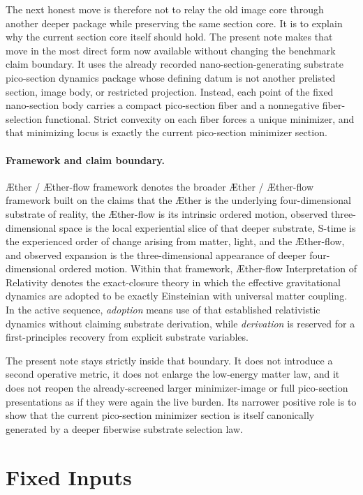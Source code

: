 \documentclass[11pt]{article}
\newcommand{\Aether}{\AE{}ther}
\newcommand{\Aflow}{\AE{}ther-flow}
\newcommand{\TheoryName}{\Aflow{} Interpretation of Relativity}
\newcommand{\TheoryProgram}{\Aether{} / \Aflow{} framework}
\begin{document}
The next honest move is therefore not to relay the old image core through another deeper package while preserving the same section core. It is to explain why the current section core itself should hold. The present note makes that move in the most direct form now available without changing the benchmark claim boundary. It uses the already recorded nano-section-generating substrate pico-section dynamics package whose defining datum is not another prelisted section, image body, or restricted projection. Instead, each point of the fixed nano-section body carries a compact pico-section fiber and a nonnegative fiber-selection functional. Strict convexity on each fiber forces a unique minimizer, and that minimizing locus is exactly the current pico-section minimizer section.

\paragraph{Framework and claim boundary.}
\TheoryProgram{} denotes the broader \Aether{} / \Aflow{} framework built on the claims that the \Aether{} is the underlying four-dimensional substrate of reality, the \Aflow{} is its intrinsic ordered motion, observed three-dimensional space is the local experiential slice of that deeper substrate, S-time is the experienced order of change arising from matter, light, and the \Aflow{}, and observed expansion is the three-dimensional appearance of deeper four-dimensional ordered motion. Within that framework, \TheoryName{} denotes the exact-closure theory in which the effective gravitational dynamics are adopted to be exactly Einsteinian with universal matter coupling. In the active sequence, \emph{adoption} means use of that established relativistic dynamics without claiming substrate derivation, while \emph{derivation} is reserved for a first-principles recovery from explicit substrate variables.

The present note stays strictly inside that boundary. It does not introduce a second operative metric, it does not enlarge the low-energy matter law, and it does not reopen the already-screened larger minimizer-image or full pico-section presentations as if they were again the live burden. Its narrower positive role is to show that the current pico-section minimizer section is itself canonically generated by a deeper fiberwise substrate selection law.

\section{Fixed Inputs}
\end{document}
